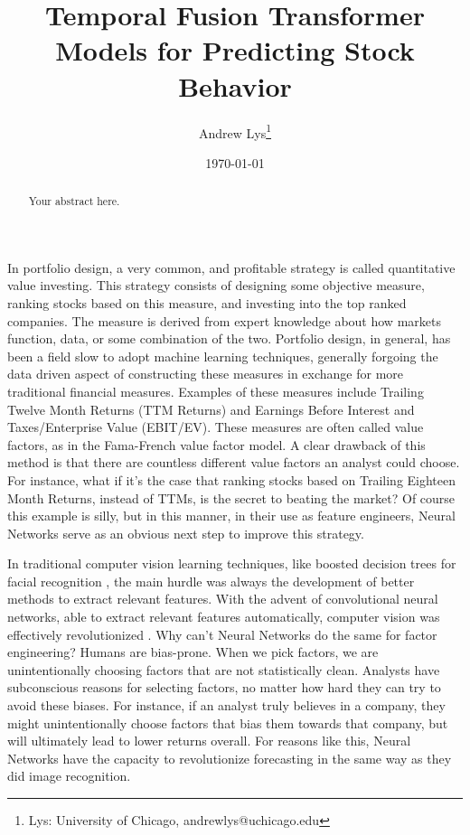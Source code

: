 \documentclass[AER]{AEA}
\begin{document}
\title{Temporal Fusion Transformer Models for Predicting Stock Behavior}
\author{Andrew Lys\thanks{Lys: University of Chicago, andrewlys@uchicago.edu}}
\date{\today}
\JEL{}
\Keywords{}

\begin{abstract}
Your abstract here.
\end{abstract}


\maketitle
In portfolio design, a very common, and profitable strategy is called quantitative value investing. 
This strategy consists of designing some objective measure, ranking stocks based on this measure, and investing into the top ranked 
companies. The measure is derived from expert knowledge about how markets function, data, or some combination 
of the two. Portfolio design, in general, has been a field slow to adopt machine learning techniques, generally 
forgoing the data driven aspect of constructing these measures in exchange for more traditional financial 
measures. Examples of these measures include Trailing Twelve Month Returns (TTM Returns) and Earnings Before 
Interest and Taxes/Enterprise Value (EBIT/EV). These measures are often called value factors, as in the 
Fama-French value factor model. A clear drawback of this method is that there are countless different value 
factors an analyst could choose. For instance, what if it's  the case that ranking stocks based on Trailing 
Eighteen Month Returns, instead of TTMs, is the secret to beating the market? Of course this example is silly, 
but in this manner, in their use as feature engineers, Neural Networks serve as an obvious next step to improve 
this strategy.

In traditional computer vision learning techniques, like boosted decision trees for facial recognition 
\cite{ada-boost}, the main hurdle was always the development of better methods to extract relevant features. 
With the advent of convolutional neural networks, able to extract relevant features automatically, computer 
vision was effectively revolutionized \cite{alexnet}. Why can't Neural Networks do the same for factor 
engineering? Humans are bias-prone. When we pick factors, we are unintentionally choosing factors that are not 
statistically clean. Analysts have subconscious reasons for selecting factors, no matter how hard they can try 
to avoid these biases. For instance, if an analyst truly believes in a company, they might unintentionally 
choose factors that bias them towards that company, but will ultimately lead to lower returns overall. For 
reasons like this, Neural Networks have the capacity to revolutionize forecasting in the same way as they did 
image recognition. 
\end{document}
